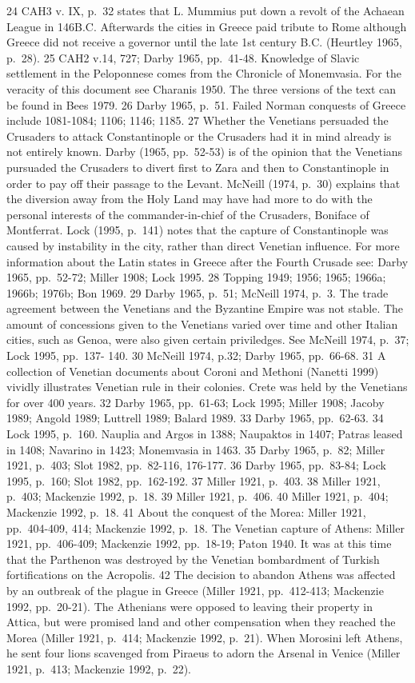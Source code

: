 \documentclass[english,]{book}
\begin{document}
24 CAH3 v. IX, p.~32 states that L. Mummius put down a revolt of the Achaean League in 146B.C. Afterwards the cities in Greece paid tribute to Rome although Greece did not receive a governor until the late 1st century B.C. (Heurtley 1965, p.~28).
25 CAH2 v.14, 727; Darby 1965, pp.~41-48. Knowledge of Slavic settlement in the Peloponnese comes from the Chronicle of Monemvasia. For the veracity of this document see Charanis 1950. The three versions of the text can be found in Bees 1979.
26 Darby 1965, p.~51. Failed Norman conquests of Greece include 1081-1084; 1106; 1146; 1185.
27 Whether the Venetians persuaded the Crusaders to attack Constantinople or the Crusaders had it in mind already is not entirely known. Darby (1965, pp.~52-53) is of the opinion that the Venetians pursuaded the Crusaders to divert first to Zara and then to Constantinople in order to pay off their passage to the Levant. McNeill (1974, p.~30) explains that the diversion away from the Holy Land may have had more to do with the personal interests of the commander-in-chief of the Crusaders, Boniface of Montferrat. Lock (1995, p.~141) notes that the capture of Constantinople was caused by instability in the city, rather than direct Venetian influence. For more information about the Latin states in Greece after the Fourth Crusade see: Darby 1965, pp.~52-72; Miller 1908; Lock 1995.
28 Topping 1949; 1956; 1965; 1966a; 1966b; 1976b; Bon 1969.
29 Darby 1965, p.~51; McNeill 1974, p.~3. The trade agreement between the Venetians and the Byzantine Empire was not stable. The amount of concessions given to the Venetians varied over time and other Italian cities, such as Genoa, were also given certain priviledges. See McNeill 1974, p.~37; Lock 1995, pp.~137- 140.
30 McNeill 1974, p.32; Darby 1965, pp.~66-68.
31 A collection of Venetian documents about Coroni and Methoni (Nanetti 1999) vividly illustrates Venetian rule in their colonies. Crete was held by the Venetians for over 400 years.
32 Darby 1965, pp.~61-63; Lock 1995; Miller 1908; Jacoby 1989; Angold 1989; Luttrell 1989; Balard 1989. 33 Darby 1965, pp.~62-63.
34 Lock 1995, p.~160. Nauplia and Argos in 1388; Naupaktos in 1407; Patras leased in 1408; Navarino in 1423; Monemvasia in 1463.
35 Darby 1965, p.~82; Miller 1921, p.~403; Slot 1982, pp.~82-116, 176-177.
36 Darby 1965, pp.~83-84; Lock 1995, p.~160; Slot 1982, pp.~162-192.
37 Miller 1921, p.~403.
38 Miller 1921, p.~403; Mackenzie 1992, p.~18.
39 Miller 1921, p.~406.
40 Miller 1921, p.~404; Mackenzie 1992, p.~18.
41 About the conquest of the Morea: Miller 1921, pp.~404-409, 414; Mackenzie 1992, p.~18. The Venetian capture of Athens: Miller 1921, pp.~406-409; Mackenzie 1992, pp.~18-19; Paton 1940. It was at this time that the Parthenon was destroyed by the Venetian bombardment of Turkish fortifications on the Acropolis. 42 The decision to abandon Athens was affected by an outbreak of the plague in Greece (Miller 1921, pp.~412-413; Mackenzie 1992, pp.~20-21). The Athenians were opposed to leaving their property in Attica, but were promised land and other compensation when they reached the Morea (Miller 1921, p.~414; Mackenzie 1992, p.~21). When Morosini left Athens, he sent four lions scavenged from Piraeus to adorn the Arsenal in Venice (Miller 1921, p.~413; Mackenzie 1992, p.~22).
\end{document}

